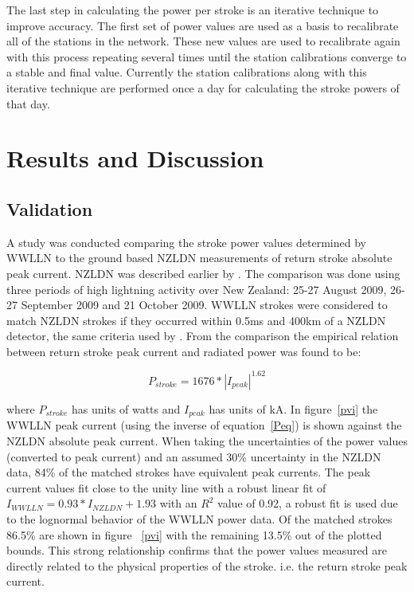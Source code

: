 \documentclass[12pt]{article}
\begin{document}
The last step in calculating the power per stroke is an iterative technique to improve accuracy. The first set of power values are used as a basis to recalibrate all of the stations in the network. These new values are used to recalibrate again with this process repeating several times until the station calibrations converge to a stable and final value. Currently the station calibrations along with this iterative technique are performed once a day for calculating the stroke powers of that day.

\section{Results and Discussion}

\subsection{Validation}

A study was conducted comparing the stroke power values determined by WWLLN to the ground based NZLDN measurements of return stroke absolute peak current. NZLDN was described earlier by \citet{Rodger2006}. The comparison was done using three periods of high lightning activity over New Zealand: 25-27 August 2009, 26-27 September 2009 and 21 October 2009. WWLLN strokes were considered to match NZLDN strokes if they occurred within 0.5ms and 400km of a NZLDN detector, the same criteria used by \citet{Rodger2006}. From the comparison the empirical relation between return stroke peak current and radiated power was found to be: 

\begin{equation}
P_{stroke} = 1676 * |I_{peak}|^{1.62}
\label{Peq}
\end{equation}

where $P_{stroke}$ has units of watts and $I_{peak}$ has units of kA. In figure~\ref{pvi} the WWLLN peak current (using the inverse of equation~\ref{Peq}) is shown against the NZLDN absolute peak current. When taking the uncertainties of the power values (converted to peak current) and an assumed 30\% uncertainty in the NZLDN data, 84\% of the matched strokes have equivalent peak currents. The peak current values fit close to the unity line with a robust linear fit of $I_{WWLLN}=0.93*I_{NZLDN}+1.93$ with an $R^2$ value of 0.92, a robust fit is used due to the lognormal behavior of the WWLLN power data. Of the matched strokes 86.5\% are shown in figure~ \ref{pvi} with the remaining 13.5\% out of the plotted bounds. This strong relationship confirms that the power values measured are directly related to the physical properties of the stroke. i.e. the return stroke peak current.
\end{document}
